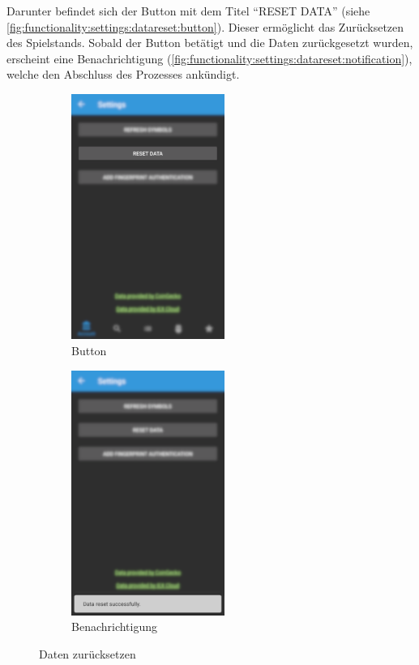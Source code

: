 \documentclass[a4paper]{article}
\begin{document}
Darunter befindet sich der Button mit dem Titel "`RESET DATA"' (siehe \autoref{fig:functionality:settings:datareset:button}). Dieser ermöglicht das Zurücksetzen des Spielstands. Sobald der Button betätigt und die Daten zurückgesetzt wurden, erscheint eine Benachrichtigung (\autoref{fig:functionality:settings:datareset:notification}), welche den Abschluss des Prozesses ankündigt.

\begin{figure}[H]
    \begin{subfigure}{.5\textwidth}
        \centering
        \includegraphics[height=8cm,keepaspectratio]{./images/settings/data_reset_button.png}
        \caption{Button}
        \label{fig:functionality:settings:datareset:button}
    \end{subfigure}
    \begin{subfigure}{.5\textwidth}
        \centering
        \includegraphics[height=8cm,keepaspectratio]{./images/settings/data_reset_done.png}
        \caption{Benachrichtigung}
        \label{fig:functionality:settings:datareset:notification}
    \end{subfigure}
    \caption{Daten zurücksetzen}
    \label{fig:functionality:settings:datareset}
\end{figure}
\end{document}
